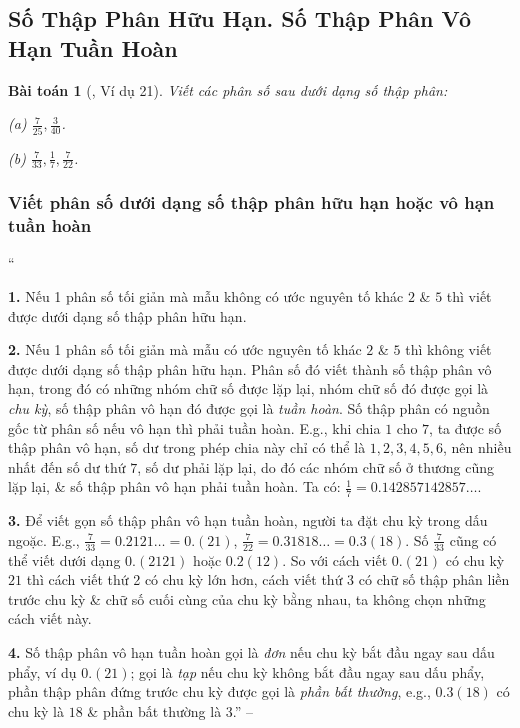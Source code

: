 \documentclass{article}
\numberwithin{equation}{section}
\newtheorem{baitoan}{Bài toán}[section]
\begin{document}

\subsection{Số Thập Phân Hữu Hạn. Số Thập Phân Vô Hạn Tuần Hoàn}

\begin{baitoan}[\cite{Binh_Toan_7_tap_1}, Ví dụ 21]
	Viết các phân số sau dưới dạng số thập phân:
	\begin{enumerate*}
		\item[(a)] $\frac{7}{25},\frac{3}{40}$.
		\item[(b)] $\frac{7}{33},\frac{1}{7},\frac{7}{22}$.
	\end{enumerate*}
\end{baitoan}

\subsubsection{Viết phân số dưới dạng số thập phân hữu hạn hoặc vô hạn tuần hoàn}
``\begin{enumerate*}
	\item[\textbf{1.}] Nếu 1 phân số tối giản mà mẫu không có ước nguyên tố khác $2$ \& $5$ thì viết được dưới dạng số thập phân hữu hạn.
	\item[\textbf{2.}] Nếu 1 phân số tối giản mà mẫu có ước nguyên tố khác $2$ \& $5$ thì không viết được dưới dạng số thập phân hữu hạn. Phân số đó viết thành số thập phân vô hạn, trong đó có những nhóm chữ số được lặp lại, nhóm chữ số đó được gọi là \textit{chu kỳ}, số thập phân vô hạn đó được gọi là \textit{tuần hoàn}. Số thập phân có nguồn gốc từ phân số nếu vô hạn thì phải tuần hoàn. E.g., khi chia $1$ cho $7$, ta được số thập phân vô hạn, số dư trong phép chia này chỉ có thể là $1,2,3,4,5,6$, nên nhiều nhất đến số dư thứ $7$, số dư phải lặp lại, do đó các nhóm chữ số ở thương cũng lặp lại, \& số thập phân vô hạn phải tuần hoàn. Ta có: $\frac{1}{7} = 0.142857142857\ldots$.
	\item[\textbf{3.}] Để viết gọn số thập phân vô hạn tuần hoàn, người ta đặt chu kỳ trong dấu ngoặc. E.g., $\frac{7}{33} = 0.2121\ldots = 0.(21)$, $\frac{7}{22} = 0.31818\ldots = 0.3(18)$. Số $\frac{7}{33}$ cũng có thể viết dưới dạng $0.(2121)$ hoặc $0.2(12)$. So với cách viết $0.(21)$ có chu kỳ $21$ thì cách viết thứ 2 có chu kỳ lớn hơn, cách viết thứ 3 có chữ số thập phân liền trước chu kỳ \& chữ số cuối cùng của chu kỳ bằng nhau, ta không chọn những cách viết này.
	\item[\textbf{4.}] Số thập phân vô hạn tuần hoàn gọi là \textit{đơn} nếu chu kỳ bắt đầu ngay sau dấu phẩy, ví dụ $0.(21)$; gọi là \textit{tạp} nếu chu kỳ không bắt đầu ngay sau dấu phẩy, phần thập phân đứng trước chu kỳ được gọi là \textit{phần bất thường}, e.g., $0.3(18)$ có chu kỳ là $18$ \& phần bất thường là $3$.'' -- \cite{Binh_Toan_7_tap_1}
\end{enumerate*}
\end{document}
